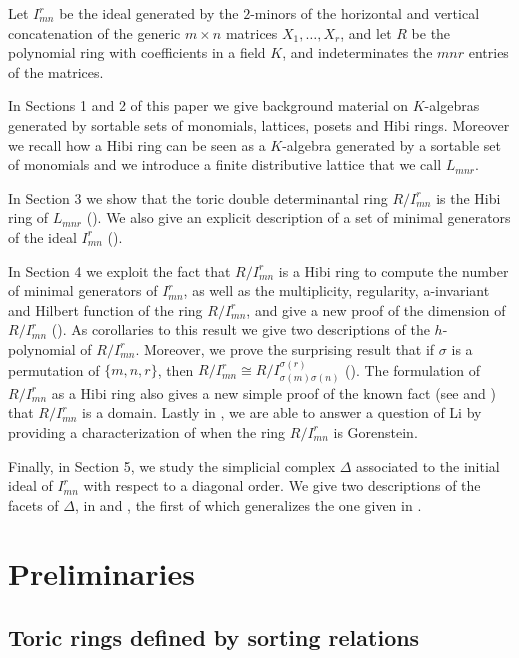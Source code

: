 \documentclass[12pt]{amsart}
\numberwithin{equation}{section}
\theoremstyle{definition}
\begin{document}
Let $I_{mn}^r$ be the ideal generated by the $2$-minors of the horizontal and vertical concatenation of the generic $m\times n$ matrices $X_1,\ldots,X_r$, and let $R$ be the polynomial ring with coefficients in a field $K$, and indeterminates the $mnr$ entries of the matrices.

In Sections 1 and 2 of this paper we give background material on $K$-algebras generated by sortable sets of monomials, lattices, posets and Hibi rings.  Moreover we recall how a Hibi ring can be seen as a $K$-algebra generated by a sortable set of monomials and we introduce a finite distributive lattice that we call $L_{mnr}$.


In Section 3 we show that the toric double determinantal ring $R/I_{mn}^r$ is the Hibi ring of $L_{mnr}$ (). We also give an explicit description of a set of minimal generators of the ideal $I_{mn}^r$ ().

In Section 4 we exploit the fact that $R/I_{mn}^r$ is a Hibi ring to compute the number of minimal generators of $I_{mn}^r$, as well as the multiplicity, regularity, a-invariant and Hilbert function of the ring $R/I_{mn}^r$, and give a new proof of the dimension of $R/I_{mn}^r$ ().  As corollaries to this result we give two descriptions of the $h$-polynomial of $R/I_{mn}^r$.  Moreover, we prove the surprising result that if $\sigma$ is a permutation of $\{m,n,r\}$, then $R/I_{mn}^r\cong R/I_{\sigma(m)\sigma(n)}^{\sigma(r)}$ (). 
The formulation of $R/I_{mn}^r$ as a Hibi ring also gives a new simple proof of the known fact (see \cite{BKMM} and \cite{L}) that $R/I_{mn}^r$ is a domain.  Lastly in , we are able to answer a question of Li by providing a characterization of when the ring $R/I_{mn}^r$ is Gorenstein.



Finally, in Section 5, we study the simplicial complex $\Delta$ associated to the initial ideal of $I_{mn}^r$ with respect to a diagonal order. We give two descriptions of the facets of $\Delta$, in  and , the first of which generalizes the one given in \cite[Theorem 3.2]{CDS}.




\section{Preliminaries}
\subsection{Toric rings defined by sorting relations}
\label{sect:sortable}
\end{document}
